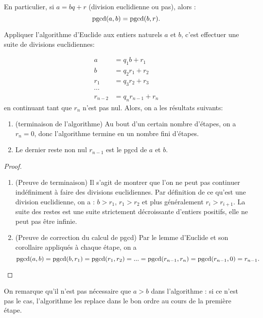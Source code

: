 \begin{corollaire} En particulier, si $a = bq+r$ (division euclidienne ou pas), alors :
\[ \operatorname{pgcd}(a,b) = \operatorname{pgcd}(b,r).\]
\end{corollaire}

\begin{theoreme}

Appliquer l'algorithme d'Euclide aux entiers naturels $a$ et $b$, c'est effectuer une suite de divisions euclidiennes:

\begin{align*}
a &= q_1 b + r_1\\
b &= q_2 r_1+r_2\\
r_1 &= q_3 r_2+ r_3\\
\cdots & \\
r_{n-2} &= q_nr_{n-1}+r_n
\end{align*}
en continuant tant que $r_n$ n'est pas nul. Alors, on a les résultats suivants:

\begin{enumerate}
\item (terminaison de l'algorithme) Au bout d'un certain nombre d'étapes, on a $r_n=0$, donc l'algorithme termine en un nombre fini d'étapes.
\item Le dernier reste non nul $r_{n-1}$ est le pgcd de $a$ et $b$.
\end{enumerate}
\end{theoreme}
\begin{proof}

\begin{enumerate}
\item (Preuve de terminaison) Il s'agit de montrer que l'on ne peut pas continuer indéfiniment à faire des divisions euclidiennes. Par définition de ce qu'est une division euclidienne, on a  : $b>r_1$, $r_1>r_2$ et plus généralement $r_i>r_{i+1}$. La suite des restes est une suite strictement décroissante d'entiers positifs, elle ne peut pas être infinie.
\item (Preuve de correction du calcul de pgcd) Par le lemme d'Euclide et son corollaire appliqués à chaque étape, on a 
\[
\operatorname{pgcd}(a,b) = \operatorname{pgcd}(b,r_1)=\operatorname{pgcd}(r_1,r_2) = ... = \operatorname{pgcd}(r_{n-1},r_n) = \operatorname{pgcd}(r_{n-1},0) = r_{n-1}.
\]

\end{enumerate}
\end{proof}

On remarque qu'il n'est pas nécessaire que $a>b$ dans l'algorithme : si ce n'est pas le cas, l'algorithme les replace dans le bon ordre au cours de la première étape.

